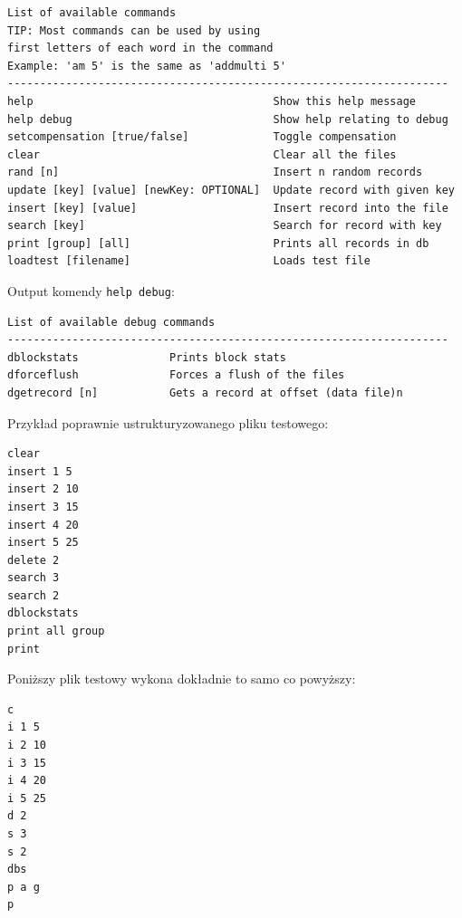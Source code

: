 \documentclass[12pt]{article}
\begin{document}
\begin{tcolorbox}[colframe=black!75, colback=white!95, title=Output komendy \texttt{help}]
\begin{verbatim}
List of available commands
TIP: Most commands can be used by using 
first letters of each word in the command
Example: 'am 5' is the same as 'addmulti 5'
--------------------------------------------------------------------
help                                     Show this help message
help debug                               Show help relating to debug
setcompensation [true/false]             Toggle compensation
clear                                    Clear all the files
rand [n]                                 Insert n random records
update [key] [value] [newKey: OPTIONAL]  Update record with given key
insert [key] [value]                     Insert record into the file
search [key]                             Search for record with key
print [group] [all]                      Prints all records in db
loadtest [filename]                      Loads test file
\end{verbatim}
\end{tcolorbox}

Output komendy \verb!help debug!:

\begin{tcolorbox}[colframe=black!75, colback=white!95, title=Output komendy \texttt{help debug}]
\begin{verbatim}
List of available debug commands
--------------------------------------------------------------------
dblockstats              Prints block stats
dforceflush              Forces a flush of the files
dgetrecord [n]           Gets a record at offset (data file)n
\end{verbatim}
\end{tcolorbox}


Przykład poprawnie ustrukturyzowanego pliku testowego:

\begin{tcolorbox}[colframe=black!75, colback=white!95, title=Plik: \texttt{text.txt}]
\begin{verbatim}
clear
insert 1 5
insert 2 10
insert 3 15
insert 4 20
insert 5 25
delete 2
search 3
search 2
dblockstats
print all group
print
\end{verbatim}
\end{tcolorbox}

Poniższy plik testowy wykona dokładnie to samo co powyższy:
\begin{tcolorbox}[colframe=black!75, colback=white!95, title=Plik: \texttt{text.txt}]
\begin{verbatim}
c
i 1 5
i 2 10
i 3 15
i 4 20
i 5 25
d 2
s 3
s 2
dbs
p a g
p
\end{verbatim}
\end{tcolorbox}
\end{document}
